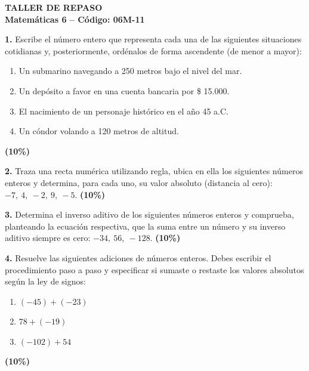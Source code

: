 \documentclass[11pt, letterpaper]{article}
\begin{document}
	
	\begin{center}
		{\Large\bfseries\textcolor{valblue}{TALLER DE REPASO}}\\[6pt]
		{\large\bfseries Matemáticas 6\textdegree{} -- Código: 06M-11}
	\end{center}
	\vspace{0.6cm}
	
	\noindent \textbf{1.} Escribe el número entero que representa cada una de las siguientes situaciones cotidianas y, posteriormente, ordénalos de forma ascendente (de menor a mayor):
	\begin{enumerate}[label=\alph*), itemsep=0.1cm]
		\item Un submarino navegando a 250 metros bajo el nivel del mar.
		\item Un depósito a favor en una cuenta bancaria por \$ 15.000.
		\item El nacimiento de un personaje histórico en el año 45 a.C.
		\item Un cóndor volando a 120 metros de altitud.
	\end{enumerate}
	\hfill \textbf{(10\%)}
	
	\vspace{0.4cm}
	
	\noindent \textbf{2.} Traza una recta numérica utilizando regla, ubica en ella los siguientes números enteros y determina, para cada uno, su valor absoluto (distancia al cero): $ -7, \ 4, \ -2, \ 9, \ -5 $.
	\hfill \textbf{(10\%)}
	
	\vspace{0.4cm}
	
	\noindent \textbf{3.} Determina el inverso aditivo de los siguientes números enteros y comprueba, planteando la ecuación respectiva, que la suma entre un número y su inverso aditivo siempre es cero: $ -34, \ 56, \ -128 $.
	\hfill \textbf{(10\%)}
	
	\vspace{0.4cm}
	
	\noindent \textbf{4.} Resuelve las siguientes adiciones de números enteros. Debes escribir el procedimiento paso a paso y especificar si sumaste o restaste los valores absolutos según la ley de signos:
	\begin{enumerate}[label=\alph*), itemsep=0.1cm]
		\item $(-45) + (-23)$
		\item $78 + (-19)$
		\item $(-102) + 54$
	\end{enumerate}
	\hfill \textbf{(10\%)}
	
\end{document}
